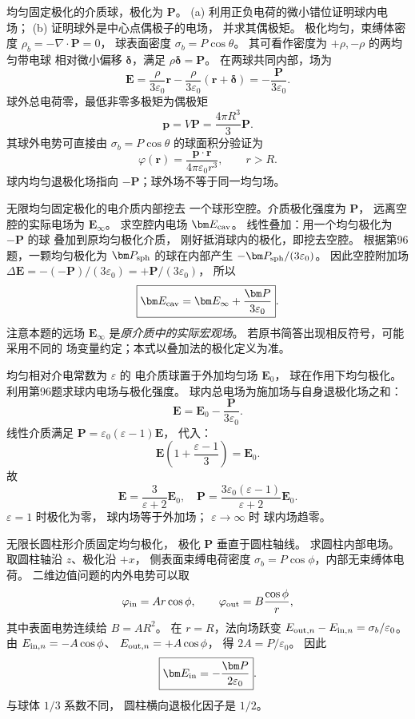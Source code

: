 均匀固定极化的介质球，极化为 $\bm P$。
(a) 利用正负电荷的微小错位证明球内电场；
(b) 证明球外是中心点偶极子的电场，
并求其偶极矩。
\exsolution
极化均匀，束缚体密度
$\rho_b=-\nabla\cdot\bm P=0$，
球表面密度 $\sigma_b=P\cos\theta$。
其可看作密度为 $+\rho,-\rho$ 的两均匀带电球
相对微小偏移 $\bm\delta$，满足
$\rho\bm\delta=\bm P$。
在两球共同内部，场为
\[
\bm E=
\frac{\rho}{3\varepsilon_0}\bm r
-\frac{\rho}{3\varepsilon_0}(\bm r+\bm\delta)
=\boxed{-\frac{\bm P}{3\varepsilon_0}}.
\]
球外总电荷零，最低非零多极矩为偶极矩
\[
\boxed{\bm p=V\bm P=
\frac{4\pi R^3}{3}\bm P}.
\]
其球外电势可直接由
$\sigma_b=P\cos\theta$ 的球面积分验证为
\[
\boxed{\varphi(\bm r)=
\frac{\bm p\cdot\bm r}
{4\pi\varepsilon_0r^3}},\qquad r>R.
\]
\excheck 球内均匀退极化场指向
$-\bm P$；球外场不等于同一均匀场。

无限均匀固定极化的电介质内部挖去
一个球形空腔。介质极化强度为 $\bm P$，
远离空腔的实际电场为 $\bm E_\infty$。
求空腔内电场 $\bm E_{\rm cav}$。
\exsolution
线性叠加：用一个均匀极化为 $-\bm P$ 的球
叠加到原均匀极化介质，
刚好抵消球内的极化，即挖去空腔。
根据第96题，一颗均匀极化为
$\bm P_{\rm sph}$ 的球在内部产生
$-\bm P_{\rm sph}/(3\varepsilon_0)$。
因此空腔附加场
$\Delta\bm E=-(-\bm P)/(3\varepsilon_0)
=+\bm P/(3\varepsilon_0)$，
所以
\[
\boxed{\bm E_{\rm cav}=
\bm E_\infty+\frac{\bm P}{3\varepsilon_0}}.
\]
\excheck 注意本题的远场 $\bm E_\infty$
是\emph{原介质中的实际宏观场}。
若原书简答出现相反符号，可能采用不同的
场变量约定；本式以叠加法的极化定义为准。

均匀相对介电常数为 $\varepsilon$ 的
电介质球置于外加均匀场 $\bm E_0$，
球在作用下均匀极化。
利用第96题求球内电场与极化强度。
\exsolution
球内总电场为施加场与自身退极化场之和：
\[
\bm E=\bm E_0-\frac{\bm P}{3\varepsilon_0}.
\]
线性介质满足
$\bm P=\varepsilon_0(\varepsilon-1)\bm E$，
代入：
\[
\bm E\left(1+\frac{\varepsilon-1}{3}\right)
=\bm E_0.
\]
故
\[
\boxed{\bm E=\frac3{\varepsilon+2}\bm E_0},
\quad
\boxed{\bm P=
\frac{3\varepsilon_0(\varepsilon-1)}
{\varepsilon+2}\bm E_0}.
\]
\excheck $\varepsilon=1$ 时极化为零，
球内场等于外加场；
$\varepsilon\to\infty$ 时
球内场趋零。

无限长圆柱形介质固定均匀极化，
极化 $\bm P$ 垂直于圆柱轴线。
求圆柱内部电场。
\exsolution
取圆柱轴沿 $z$、极化沿 $+x$，
侧表面束缚电荷密度
$\sigma_b=P\cos\phi$，内部无束缚体电荷。
二维边值问题的内外电势可以取
\[
\varphi_{\rm in}=Ar\cos\phi,\qquad
\varphi_{\rm out}=B\frac{\cos\phi}{r},
\]
其中表面电势连续给 $B=AR^2$。
在 $r=R$，法向场跃变
$E_{{\rm out},n}-E_{{\rm in},n}=
\sigma_b/\varepsilon_0$。
由
$E_{{\rm in},n}=-A\cos\phi$、
$E_{{\rm out},n}=+A\cos\phi$，
得 $2A=P/\varepsilon_0$。
因此
\[
\boxed{\bm E_{\rm in}=
-\frac{\bm P}{2\varepsilon_0}}.
\]
\excheck 与球体 $1/3$ 系数不同，
圆柱横向退极化因子是 $1/2$。

